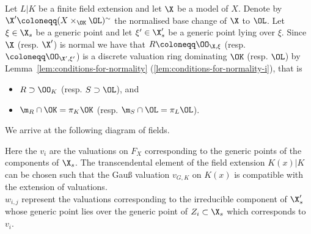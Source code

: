Let $L|K$ be a finite field extension and let $\X$ be a model of $X$.
Denote by $\X' \coloneqq (X\times_{\OK} \OL)^\sim$ the normalised base change of $\X$ to $\OL$.
Let $\xi \in \X_s$ be a generic point and let $\xi' \in \X_s'$ be a generic point lying over $\xi$.
Since $\X$ (resp. $\X'$) is normal we have that $R \coloneqq \OO_{\X, \xi}$ (resp. $ \coloneqq \OO_{\X', \xi'}$)
is a discrete valuation ring dominating $\OK$ (resp. $\OL$) by
Lemma~\ref{lem:conditions-for-normality} (\ref{lem:conditions-for-normality-i}), that is
\begin{itemize}
    \item $R \supset \OO_K$ (resp. $S \supset \OL$), and
    \item $\m_R \cap \OK = \pi_K\OK$ (resp. $\m_S \cap \OL = \pi_L\OL$).
\end{itemize}
We arrive at the following diagram of fields.


\begin{figure}[H]\label{fig:valuations-and-field-extensions}
    \centering
\end{figure}

Here the $v_i$ are the valuations on $F_X$ corresponding to the generic points of the components of $\X_s$.
The transcendental element of the field extension $K(x)|K$ can be chosen such that the Gauß valuation $v_{{\scriptscriptstyle G}, K}$
on $K(x)$ is compatible with the extension of valuations. \\
$w_{i, j}$ represent the valuations corresponding to the irreducible component of $\X_s'$ whose generic point lies over
the generic point of $Z_i \subset \X_s$ which corresponds to $v_i$.

